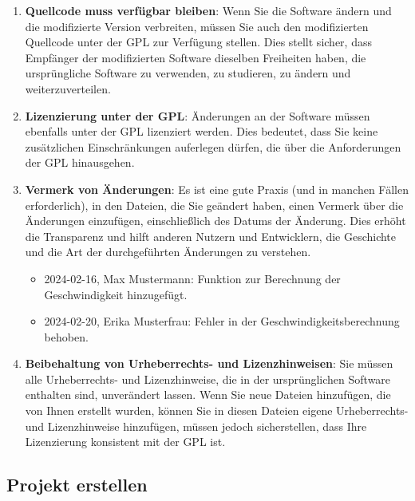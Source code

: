 \documentclass{vorlage-design-main}
\begin{document}
\begin{enumerate}
\def\labelenumi{\arabic{enumi}.}
\item
  \textbf{Quellcode muss verfügbar bleiben}: Wenn Sie die Software
  ändern und die modifizierte Version verbreiten, müssen Sie auch den
  modifizierten Quellcode unter der GPL zur Verfügung stellen. Dies
  stellt sicher, dass Empfänger der modifizierten Software dieselben
  Freiheiten haben, die ursprüngliche Software zu verwenden, zu
  studieren, zu ändern und weiterzuverteilen.
\item
  \textbf{Lizenzierung unter der GPL}: Änderungen an der Software müssen
  ebenfalls unter der GPL lizenziert werden. Dies bedeutet, dass Sie
  keine zusätzlichen Einschränkungen auferlegen dürfen, die über die
  Anforderungen der GPL hinausgehen.
\item
  \textbf{Vermerk von Änderungen}: Es ist eine gute Praxis (und in
  manchen Fällen erforderlich), in den Dateien, die Sie geändert haben,
  einen Vermerk über die Änderungen einzufügen, einschließlich des
  Datums der Änderung. Dies erhöht die Transparenz und hilft anderen
  Nutzern und Entwicklern, die Geschichte und die Art der durchgeführten
  Änderungen zu verstehen.

  \begin{itemize}
  
  \item
    2024-02-16, Max Mustermann: Funktion zur Berechnung der
    Geschwindigkeit hinzugefügt.
  \item
    2024-02-20, Erika Musterfrau: Fehler in der
    Geschwindigkeitsberechnung behoben.
  \end{itemize}
\item
  \textbf{Beibehaltung von Urheberrechts- und Lizenzhinweisen}: Sie
  müssen alle Urheberrechts- und Lizenzhinweise, die in der
  ursprünglichen Software enthalten sind, unverändert lassen. Wenn Sie
  neue Dateien hinzufügen, die von Ihnen erstellt wurden, können Sie in
  diesen Dateien eigene Urheberrechts- und Lizenzhinweise hinzufügen,
  müssen jedoch sicherstellen, dass Ihre Lizenzierung konsistent mit der
  GPL ist.
\end{enumerate}

\newpage

\hypertarget{projekt-erstellen}{%
\subsection{Projekt erstellen}\label{projekt-erstellen}}
\end{document}
